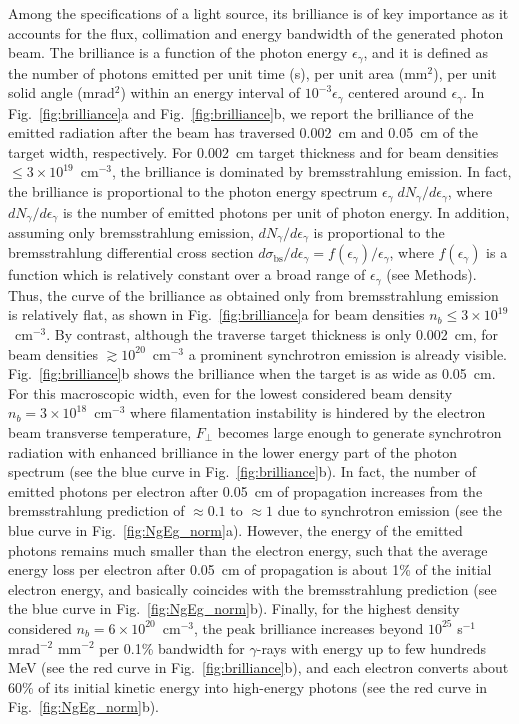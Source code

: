 \documentclass[fleqn,11pt]{wlscirep}
\begin{document}
Among the specifications of a light source, its brilliance is of key importance as it accounts for the flux, collimation and energy bandwidth of the generated photon beam. The brilliance is a function of the photon energy $\epsilon_\gamma$, and it is defined as the number of photons emitted per unit time (s), per unit area (mm$^2$), per unit solid angle (mrad$^2$) within an energy interval of $10^{-3}\epsilon_\gamma$ centered around $\epsilon_\gamma$. 
In Fig.~\ref{fig:brilliance}a and Fig.~\ref{fig:brilliance}b, we report the brilliance of the emitted radiation after the beam has traversed 0.002~cm  and 0.05~cm of the target width, respectively.  
For 0.002~cm target thickness and for beam densities $\leq3\times10^{19}$~cm$^{-3}$, the brilliance is dominated by bremsstrahlung emission. In fact, the brilliance is proportional to the photon energy spectrum $\epsilon_\gamma\;dN_\gamma/d\epsilon_\gamma$, where $dN_\gamma/d\epsilon_\gamma$ is the number of emitted photons per unit of photon energy. In addition, assuming only bremsstrahlung emission, $dN_\gamma/d\epsilon_\gamma$ is proportional to the bremsstrahlung differential cross section $d\sigma_\text{bs}/d\epsilon_\gamma=f(\epsilon_\gamma)/\epsilon_\gamma$, where $f(\epsilon_\gamma)$ is a function which is relatively constant over a broad range of $\epsilon_\gamma$ (see Methods). Thus, the curve of the brilliance as obtained only from bremsstrahlung emission is relatively flat, as shown in Fig.~\ref{fig:brilliance}a for beam densities $n_b \leq 3\times 10^{19}$~cm$^{-3}$. By contrast, although the traverse target thickness is only 0.002~cm, for beam densities $\gtrsim 10^{20}$~cm$^{-3}$ a prominent synchrotron emission is already visible. 
Fig.~\ref{fig:brilliance}b shows the brilliance when the target is as wide as 0.05~cm. 
For this macroscopic width, even for the lowest considered beam density $n_b=3\times10^{18}$~cm$^{-3}$ where filamentation instability is hindered by the electron beam transverse temperature, $F_\perp$ becomes large enough to generate synchrotron radiation with enhanced brilliance in the lower energy part of the photon spectrum (see the blue curve in Fig.~\ref{fig:brilliance}b). In fact, the number of emitted photons per electron after 0.05~cm of propagation increases from the bremsstrahlung prediction of $\approx0.1$ to $\approx 1$ due to synchrotron emission (see the blue curve in Fig.~\ref{fig:NgEg_norm}a). However, the energy of the emitted photons remains much smaller than the electron energy, such that the average energy loss per electron after 0.05~cm of propagation is about 1\% of the initial electron energy, and basically coincides with the bremsstrahlung prediction (see the blue curve in Fig.~\ref{fig:NgEg_norm}b). Finally, for the highest density considered $n_b=6\times10^{20}$~cm$^{-3}$, the peak brilliance increases beyond $10^{25}$ s$^{-1}$ mrad$^{-2}$ mm$^{-2}$ per 0.1\% bandwidth for $\gamma$-rays with energy up to few hundreds MeV (see the red curve in Fig.~\ref{fig:brilliance}b), and each electron converts about 60\% of its initial kinetic energy into high-energy photons (see the red curve in Fig.~\ref{fig:NgEg_norm}b).
\end{document}
